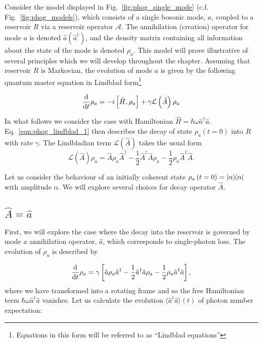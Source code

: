 Consider the model displayed in Fig.~\ref{fig:phog_single_mode} (c.f. Fig.~\ref{fig:phog_models}\MakeUppercase{}), which consists of a single bosonic mode, $a$, coupled to a reservoir $R$ via a reservoir operator $\mathcal{A}$. The annihilation (creation) operator for mode $a$ is denoted $\hat{a} \left(\hat{a}^\dagger\right)$, and the density matrix containing all information about the state of the mode is denoted $\rho_a$. This model will prove illustrative of several principles which we will develop throughout the chapter. Assuming that reservoir $R$ is Markovian, the evolution of mode $a$ is given by the following quantum master equation in Lindblad form\footnote{Equations in this form will be referred to as ``Lindblad equations''}

\begin{equation}\label{eqn:phog_lindblad_1}
\frac{\mathrm{d}}{\mathrm{d}t} \rho_a =  - i \left[\hat{H}, \rho_a\right] + \gamma \mathcal{L}\left(\hat{A}\right)\rho_a
\end{equation}

\noindent In what follows we consider the case with Hamiltonian $\hat{H} = \hbar \omega \hat{a}^\dagger \hat{a}$. Eq.~\ref{eqn:phog_lindblad_1} then describes the decay of state $\rho_a\left(t=0\right)$ into $R$ with rate $\gamma$. The Lindbladian term $\mathcal{L}\left(\hat{A}\right)$ takes the usual form
\begin{equation}\label{eqn:phog_lindbladian_form}
\mathcal{L}\left(\hat{A}\right)\rho_a = \hat{A}\rho_a\hat{A}^\dagger - \frac{1}{2} \hat{A}^\dagger \hat{A} \rho_a - \frac{1}{2} \rho_a \hat{A}^\dagger \hat{A}.
\end{equation}

\noindent Let us consider the behaviour of an initially coherent state $\rho_a\left(t=0\right) = \dyad{\alpha}$ with amplitude $\alpha$. We will explore several choices for decay operator $\hat{A}$.

\subsection{$\hat{A} = \hat{a}$}
First, we will explore the case where the decay into the reservoir is governed by mode $a$ annihilation operator, $\hat{a}$, which corresponds to single-photon loss.%
The evolution of $\rho_a$ is described by

\begin{equation}\label{eqn:phog_lindblad_single_photon_loss}
\frac{\mathrm{d}}{\mathrm{d}t} \rho_a = \gamma\left[\hat{a}\rho_a \hat{a}^\dagger - \frac{1}{2} \hat{a}^\dagger \hat{a} \rho_a - \frac{1}{2} \rho_a \hat{a}^\dagger \hat{a}\right],
\end{equation}
where we have transformed into a rotating frame and so the free Hamiltonian term $\hbar \omega \hat{a}^\dagger \hat{a}$ vanishes. Let us calculate the evolution $\langle \hat{a}^\dagger \hat{a}\rangle\left(t\right)$ of photon number expectation:

